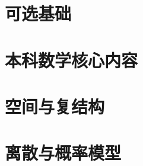 \documentclass[UTF8,oneside,fontset=none]{ctexbook}
\theoremstyle{definition}
\begin{document}
\frontmatter
\tableofcontents



\mainmatter
\part{可选基础}





\part{本科数学核心内容}









\part{空间与复结构}





\part{离散与概率模型}





\backmatter

\end{document}
